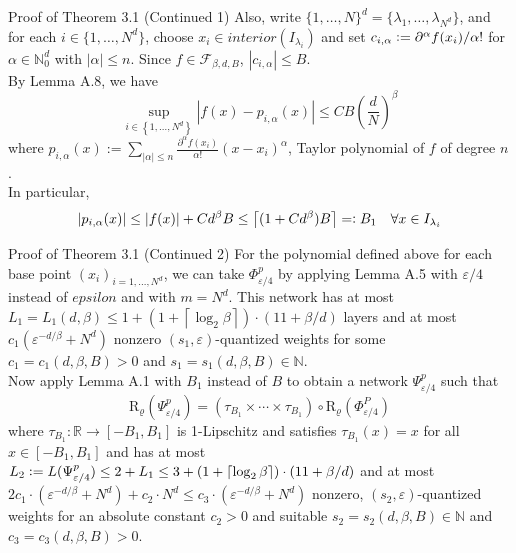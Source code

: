 \documentclass{if-beamer}
\newcommand{\defeq}{\vcentcolon=}
\newcommand{\eqdef}{=\vcentcolon}
\begin{document}
\begin{frame}{Proof of Theorem 3.1 (Continued 1)}
    Also, write $\{1,\dots, N \}^d = \{\lambda_1,\dots,\lambda_{N^d} \}$, and for each $i \in \{1,\dots,N^d \}$, choose $x_i \in interior(I_{\lambda_i})$ and set $c_{i,\alpha} \defeq \partial^{\alpha}f(x_i)/\alpha!$ for $\alpha \in \mathbb{N}_0^d$ with $|\alpha| \leq n$. Since $f \in \mathcal{F}_{\beta, d, B}$, $|c_{i,\alpha}| \leq B$.\\
    By Lemma A.8, we have $$ \sup _{i \in\left\{1, \ldots, N^{d}\right\}}\left|f(x)-p_{i, \alpha}(x)\right| \leq C B\left(\frac{d}{N}\right)^{\beta}$$ where $p_{i, \alpha}(x):=\sum_{|\alpha| \leq n} \frac{\partial^{\alpha} f\left(x_{i}\right)}{\alpha !}\left(x-x_{i}\right)^{\alpha}$, Taylor polynomial of $f$ of degree $n$.\\
    In particular, $$ |p_{i, \alpha}(x)| \leq |f(x)| + Cd^{\beta}B \leq \left\lceil (1+Cd^{\beta})B\right\rceil \eqdef B_1 \quad \forall x \in I_{\lambda_i}$$
\end{frame}

\begin{frame}{Proof of Theorem 3.1 (Continued 2)}
    For the polynomial defined above for each base point $(x_i)_{i=1,\dots,N^d}$, we can take $\Phi^p_{\varepsilon/4}$ by applying Lemma A.5 with $\varepsilon/4$ instead of $epsilon$ and with $m=N^d$. This network has at most $L_1 = L_1(d, \beta) \leq 1+\left(1+\left\lceil\log _{2} \beta\right\rceil\right) \cdot(11+\beta / d)$ layers and at most $c_1 \left(\varepsilon^{-d / \beta}+N^d\right)$ nonzero $(s_1, \varepsilon)$-quantized weights for some $c_1=c_1(d,\beta,B)>0$ and $s_1=s_1(d,\beta,B)\in \mathbb{N}$.\\
    Now apply Lemma A.1 with $B_1$ instead of $B$ to obtain a network $\Psi^p_{\varepsilon/4}$ such that 
    $$\mathrm{R}_{\varrho}\left(\Psi_{\varepsilon / 4}^{p}\right)=\left(\tau_{B_{1}} \times \cdots \times \tau_{B_{1}}\right) \circ \mathrm{R}_{\varrho}\left(\Phi_{\varepsilon / 4}^{P}\right)$$
    where $\tau_{B_{1}}: \mathbb{R} \rightarrow\left[-B_{1}, B_{1}\right]$ is 1-Lipschitz and satisfies $\tau_{B_{1}}(x)=x$ for all $x \in\left[-B_{1}, B_{1}\right]$ and has at most $L_2 \defeq L(\Psi_{\varepsilon / 4}^{p}) \leq 2 + L_1 \leq 3+\left(1+\left\lceil\log _{2} \beta\right\rceil\right)\cdot(11+\beta / d)$ and at most $2 c_{1} \cdot\left(\varepsilon^{-d / \beta}+N^{d}\right)+c_{2} \cdot N^{d} \leq c_{3} \cdot\left(\varepsilon^{-d / \beta}+N^{d}\right)$ nonzero, $\left(s_{2}, \varepsilon\right)$-quantized weights for an absolute constant $c_{2}>0$ and suitable $s_{2}=s_{2}(d, \beta, B) \in \mathbb{N}$ and $c_{3}=c_{3}(d, \beta, B)>0$. 
\end{frame}
\end{document}
